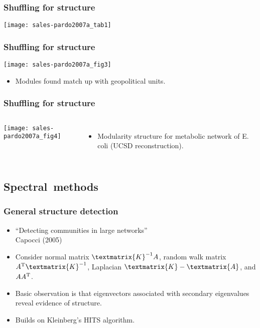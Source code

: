 \begin{frame}
  \frametitle{Shuffling for structure}

  \texttt{[image: sales-pardo2007a\_tab1]}

\end{frame}

\begin{frame}
  \frametitle{Shuffling for structure}

  \texttt{[image: sales-pardo2007a\_fig3]}

  \begin{itemize}
  \item 
    Modules found match up with geopolitical units.
  \end{itemize}


\end{frame}

\begin{frame}
  \frametitle{Shuffling for structure}

  \begin{columns}
    \texttt{[image: sales-pardo2007a\_fig4]}
    \begin{itemize}
    \item<1->
      Modularity structure for 
      metabolic network of E. coli
      (UCSD reconstruction).
    \end{itemize}
  \end{columns}

\end{frame}


\subsection{Spectral\ methods}

\begin{frame}
  \frametitle{General structure detection}

  \begin{itemize}
  \item<1-> 
    ``Detecting communities in large networks''\\
    Capocci \etal (2005)\cite{capocci2005a}
  \item<2-> 
    Consider normal matrix $\textmatrix{K}^{-1} A$,
    random walk matrix $A^{\textnormal{T}} \textmatrix{K}^{-1}$,
    Laplacian $\textmatrix{K} - \textmatrix{A}$,
    and $A A^{\textnormal{T}}$.
  \item<3->
    Basic observation is that eigenvectors
    associated with secondary eigenvalues
    reveal evidence of structure.
  \item<4->
    Builds on Kleinberg's HITS algorithm.
  \end{itemize}

\end{frame}


